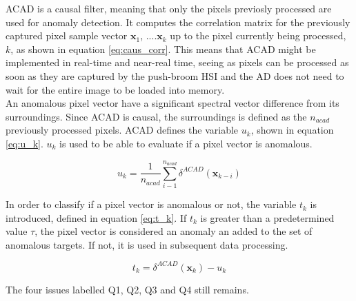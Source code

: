 ACAD is a causal filter, meaning that only the pixels previosly processed are used for anomaly detection.  It computes the correlation matrix for the previously captured pixel sample vector {$\textbf{x}_1$, ....$\textbf{x}_k$} up to the pixel currently being processed, $k$, as shown in equation \ref{eq:caus_corr}. This means that ACAD might be implemented in real-time and near-real time, seeing as pixels can be processed as soon as they are captured by the push-broom HSI and the AD does not need to wait for the entire image to be loaded into memory. \\

An anomalous pixel vector have a significant spectral vector difference from its surroundings. Since ACAD is causal, the surroundings is defined as the $n_{acad}$ previously processed pixels. %
ACAD defines the variable $u_k$, shown in equation \ref{eq:u_k}. $u_k$ is used to be able to evaluate if a pixel vector is anomalous. 

\begin{equation}
    u_k = \frac{1}{n_{acad}}\sum_{i-1}^{n_{acad}}  \delta^{ACAD}(\textbf{x}_{k-i})
    \label{eq:u_k}
\end{equation}

In order to classify if a pixel vector is anomalous or not, the variable $t_k$ is introduced, defined in equation \ref{eq:t_k}. If $t_k$ is greater than a predetermined value $\tau$, the pixel vector is considered an anomaly an added to the set of anomalous targets. If not, it is used in subsequent data processing. 

\begin{equation}
    t_k = \delta^{ACAD}(\textbf{x}_{k}) - u_k
    \label{eq:t_k}
\end{equation}


The four issues labelled Q1, Q2, Q3 and Q4 still remains. 





